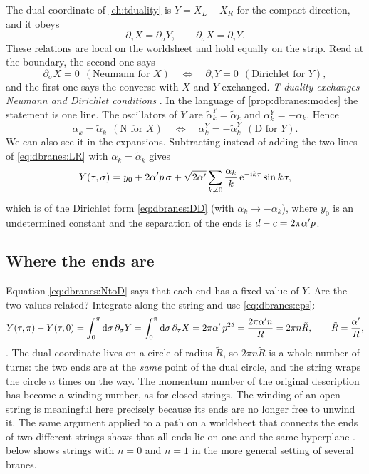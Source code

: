 The dual coordinate of \cref{ch:tduality} is $Y=X_L-X_R$ for the compact direction, and it obeys
\begin{equation}\label{eq:dbranes:eps}
 \partial_\tau X=\partial_\sigma Y,\qquad \partial_\sigma X=\partial_\tau Y .
\end{equation}
These relations are local on the worldsheet and hold equally on the strip. Read at the
boundary, the second one says
\begin{equation}\label{eq:dbranes:NtoD}
 \partial_\sigma X=0\ \ (\text{Neumann for }X)\quad\Longleftrightarrow\quad
 \partial_\tau Y=0\ \ (\text{Dirichlet for }Y),
\end{equation}
and the first one says the converse with $X$ and $Y$ exchanged. \emph{T-duality exchanges Neumann
and Dirichlet conditions} .
 In the language of \cref{prop:dbranes:modes} the statement is
one line. The oscillators of $Y$ are $\tilde\alpha^Y_k=\tilde\alpha_k$ and $\alpha^Y_k=-\alpha_k$. Hence
\[
 \alpha_k=\tilde\alpha_k\ \ (\text{N for }X)\quad\Longleftrightarrow\quad
 \alpha^Y_k=-\tilde\alpha^Y_k\ \ (\text{D for }Y).
\]
We can also see it in the expansions. Subtracting instead of adding the two lines of
\eqref{eq:dbranes:LR} with $\alpha_k=\tilde\alpha_k$ gives
\begin{equation}\label{eq:dbranes:Y}
 Y(\tau,\sigma)=y_0+2\alpha' p\,\sigma+\sqrt{2\alpha'}\sum_{k\ne0}\frac{\alpha_k}{k}\,
   \mathrm{e}^{-\mathrm{i} k\tau}\sin k\sigma ,
\end{equation}
which is of the Dirichlet form \eqref{eq:dbranes:DD} (with $\alpha_k\to-\alpha_k$), where $y_0$ is
an undetermined constant and the separation of the ends is $d-c=2\pi\alpha' p$.

\subsection{Where the ends are}

Equation \eqref{eq:dbranes:NtoD} says that each end has a fixed value of $Y$. Are the two values
related? Integrate along the string and use \eqref{eq:dbranes:eps}:
\begin{equation}\label{eq:dbranes:ends}
 Y(\tau,\pi)-Y(\tau,0)=\int_0^\pi\mathrm{d}\sigma\,\partial_\sigma Y
 =\int_0^\pi\mathrm{d}\sigma\,\partial_\tau X=2\pi\alpha'\,p^{25}=\frac{2\pi\alpha' n}{R}=2\pi n\tilde R ,
 \qquad\tilde R=\frac{\alpha'}{R},
\end{equation}
. The dual coordinate lives on a circle of radius
$\tilde R$, so $2\pi n\tilde R$ is a whole number of turns: the two ends are at the \emph{same}
point of the dual circle, and the string wraps the circle $n$ times on the way. The momentum
number of the original description has become a winding number, as for closed strings. The
winding of an open string is meaningful here precisely because its ends are no longer free to
unwind it. The same argument applied to a path on a worldsheet that connects the ends of two
different strings shows that all ends lie on one and the same hyperplane .  below shows strings with $n=0$ and $n=1$ in the more
general setting of several branes.

